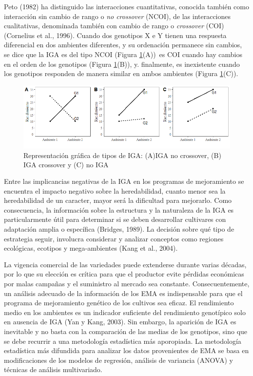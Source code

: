 Peto (1982) ha distinguido las interacciones cuantitativas, conocida también como interacción sin cambio de rango o \emph{no crossover} (NCOI), de las interacciones cualitativas, denominada también con
cambio de rango o \emph{crossover} (COI) (Cornelius et al., 1996). Cuando dos genotipos X e Y tienen una respuesta diferencial en dos ambientes diferentes, y su ordenación permanece sin cambios, se dice que la IGA es del tipo NCOI (Figura \ref{fig:fig11}(A))\, es COI cuando hay cambios en el orden de los genotipos (Figura  \ref{fig:fig11}(B)), y. finalmente, es inexistente cuando los genotipos responden de manera similar en ambos ambientes (Figura \ref{fig:fig11}(C)). 


\begin{figure}[h]
\begin{center}
\includegraphics[width=14cm]{./Graficos/interac}
\end{center}
\caption{Representación gráfica de tipos de IGA: (A)IGA no crossover, (B) IGA crossover y (C) no IGA}
\label{fig:fig11}
\end{figure}


Entre las implicancias negativas de la IGA en los programas de mejoramiento se encuentra el impacto negativo sobre la heredabilidad, cuanto menor sea la heredabilidad de un caracter, mayor será la dificultad para mejorarlo. Como consecuencia, la información sobre la estructura y la naturaleza de la IGA es particularmente útil para determinar si se deben desarrollar cultivares con adaptación amplia o específica (Bridges, 1989). La decisión sobre qué tipo de estrategia seguir, involucra considerar y analizar  conceptos como regiones ecológicas, ecotipos y mega-ambientes (Kang et al., 2004).


La vigencia comercial de las variedades puede extenderse durante varias décadas, por lo que su elección es crítica para que el productor evite pérdidas económicas por malas campañas y el suministro al mercado sea constante. Consecuentemente, un análisis adecuado de la información de los EMA es indispensable para que el programa de mejoramiento genético de los cultivos sea eficaz. El rendimiento medio en los ambientes es un indicador suficiente del rendimiento genotípico solo en ausencia de IGA (Yan y Kang, 2003). Sin embargo, la aparición de IGA es inevitable y no basta con la comparación de las medias de los genotipos, sino que se debe recurrir a una metodología estadística más aporopiada. La metodología estadística más difundida para analizar los datos provenientes de EMA se basa en modificaciones de los modelos de regresión, análisis de variancia (ANOVA) y técnicas de análisis multivariado. 

